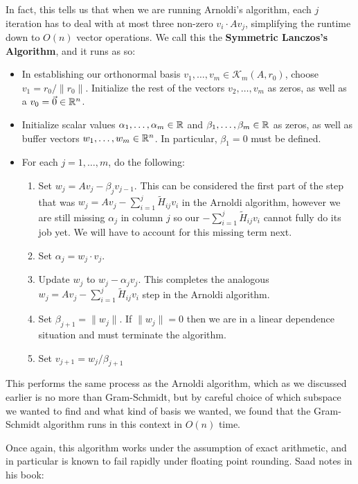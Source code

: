 \documentclass[11pt]{article}
\begin{document}
In fact, this tells us that when we are running Arnoldi's algorithm, each $j$ iteration has to deal with at most three non-zero $v_i \cdot A v_j$, simplifying the runtime down to $O(n)$ vector operations. We call this the \textbf{Symmetric Lanczos's Algorithm}, and it runs as so: \begin{itemize}
\item In establishing our orthonormal basis $v_1, \dots, v_m \in \mathcal K_m (A, r_0)$, choose $v_1 = r_0 / \lVert r_0 \rVert$. Initialize the rest of the vectors $v_2, \dots, v_m$ as zeros, as well as a $v_0 = \vec 0 \in \mathbb{R}^n$.
\item Initialize scalar values $\alpha_1, \dots, \alpha_m \in \mathbb{R}$ and $\beta_1, \dots, \beta_m \in \mathbb{R}$ as zeros, as well as buffer vectors $w_1, \dots, w_m \in \mathbb{R}^n$. In particular, $\beta_1 = 0$ must be defined.
\item For each $j = 1, \dots, m$, do the following: \begin{enumerate}
\item Set $w_j = Av_j - \beta_j v_{j - 1}$. This can be considered the first part of the step that was $w_j = Av_j - \sum_{i=1}^j \tilde H_{ij} v_i$ in the Arnoldi algorithm, however we are still missing $\alpha_j$  in column $j$ so our $-\sum_{i=1}^j \tilde H_{ij} v_i$ cannot fully do its job yet. We will have to account for this missing term next.
\item Set $\alpha_j = w_j \cdot v_j$.
\item Update $w_j$ to  $w_j - \alpha_j v_j$. This completes the analogous $w_j = Av_j - \sum_{i=1}^j \tilde H_{ij} v_i$ step in the Arnoldi algorithm.
\item Set $\beta_{j+1} = \lVert w_j \rVert$. If $\lVert w_j \rVert = 0$ then we are in a linear dependence situation and must terminate the algorithm.
\item Set $v_{j+1} = w_{j}/ \beta_{j+1}$
\end{enumerate}
\end{itemize}

This performs the same process as the Arnoldi algorithm, which as we discussed earlier is no more than Gram-Schmidt, but by careful choice of which subspace we wanted to find and what kind of basis we wanted, we found that the Gram-Schmidt algorithm runs in this context in $O(n)$ time.

Once again, this algorithm works under the assumption of exact arithmetic, and in particular is known to fail rapidly under floating point rounding. Saad notes in his book:
\end{document}
